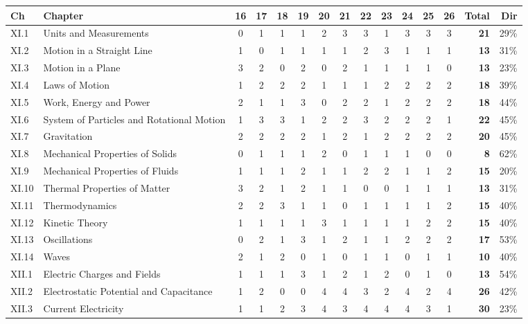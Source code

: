 {\footnotesize\setlength{\tabcolsep}{2.6pt}\renewcommand{\arraystretch}{1.12}
\begin{tabularx}{\linewidth}{@{}l>{\raggedright\arraybackslash}X*{11}{c}rr@{}}\toprule
Ch & Chapter & 16 & 17 & 18 & 19 & 20 & 21 & 22 & 23 & 24 & 25 & 26 & Total & Dir\\\midrule
XI.1 & Units and Measurements & 0 & 1 & 1 & 1 & 2 & 3 & 3 & 1 & 3 & 3 & 3 & \textbf{21} & 29\%\\
XI.2 & Motion in a Straight Line & 1 & 0 & 1 & 1 & 1 & 1 & 2 & 3 & 1 & 1 & 1 & \textbf{13} & 31\%\\
XI.3 & Motion in a Plane & 3 & 2 & 0 & 2 & 0 & 2 & 1 & 1 & 1 & 1 & 0 & \textbf{13} & 23\%\\
XI.4 & Laws of Motion & 1 & 2 & 2 & 2 & 1 & 1 & 1 & 2 & 2 & 2 & 2 & \textbf{18} & 39\%\\
XI.5 & Work, Energy and Power & 2 & 1 & 1 & 3 & 0 & 2 & 2 & 1 & 2 & 2 & 2 & \textbf{18} & 44\%\\
XI.6 & System of Particles and Rotational Motion & 1 & 3 & 3 & 1 & 2 & 2 & 3 & 2 & 2 & 2 & 1 & \textbf{22} & 45\%\\
XI.7 & Gravitation & 2 & 2 & 2 & 2 & 1 & 2 & 1 & 2 & 2 & 2 & 2 & \textbf{20} & 45\%\\
XI.8 & Mechanical Properties of Solids & 0 & 1 & 1 & 1 & 2 & 0 & 1 & 1 & 1 & 0 & 0 & \textbf{8} & 62\%\\
XI.9 & Mechanical Properties of Fluids & 1 & 1 & 1 & 2 & 1 & 1 & 2 & 2 & 1 & 1 & 2 & \textbf{15} & 20\%\\
XI.10 & Thermal Properties of Matter & 3 & 2 & 1 & 2 & 1 & 1 & 0 & 0 & 1 & 1 & 1 & \textbf{13} & 31\%\\
XI.11 & Thermodynamics & 2 & 2 & 3 & 1 & 1 & 0 & 1 & 1 & 1 & 1 & 2 & \textbf{15} & 40\%\\
XI.12 & Kinetic Theory & 1 & 1 & 1 & 1 & 3 & 1 & 1 & 1 & 1 & 2 & 2 & \textbf{15} & 40\%\\
XI.13 & Oscillations & 0 & 2 & 1 & 3 & 1 & 2 & 1 & 1 & 2 & 2 & 2 & \textbf{17} & 53\%\\
XI.14 & Waves & 2 & 1 & 2 & 0 & 1 & 0 & 1 & 1 & 0 & 1 & 1 & \textbf{10} & 40\%\\
\midrule
XII.1 & Electric Charges and Fields & 1 & 1 & 1 & 3 & 1 & 2 & 1 & 2 & 0 & 1 & 0 & \textbf{13} & 54\%\\
XII.2 & Electrostatic Potential and Capacitance & 1 & 2 & 0 & 0 & 4 & 4 & 3 & 2 & 4 & 2 & 4 & \textbf{26} & 42\%\\
XII.3 & Current Electricity & 1 & 1 & 2 & 3 & 4 & 3 & 4 & 4 & 4 & 3 & 1 & \textbf{30} & 23\%\\

\end{tabularx}}
